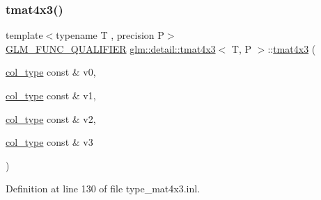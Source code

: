\subsubsection{\texorpdfstring{tmat4x3()}{tmat4x3()}\hspace{0.1cm}{\footnotesize\ttfamily [7/22]}}
{\footnotesize\ttfamily template$<$typename T , precision P$>$ \\
\hyperlink{setup_8hpp_a33fdea6f91c5f834105f7415e2a64407}{G\+L\+M\+\_\+\+F\+U\+N\+C\+\_\+\+Q\+U\+A\+L\+I\+F\+I\+ER} \hyperlink{structglm_1_1detail_1_1tmat4x3}{glm\+::detail\+::tmat4x3}$<$ T, P $>$\+::\hyperlink{structglm_1_1detail_1_1tmat4x3}{tmat4x3} (\begin{DoxyParamCaption}\item[{\hyperlink{structglm_1_1detail_1_1tmat4x3_a58afd510f7ab968e5a86e20f2f3979de}{col\+\_\+type} const \&}]{v0,  }\item[{\hyperlink{structglm_1_1detail_1_1tmat4x3_a58afd510f7ab968e5a86e20f2f3979de}{col\+\_\+type} const \&}]{v1,  }\item[{\hyperlink{structglm_1_1detail_1_1tmat4x3_a58afd510f7ab968e5a86e20f2f3979de}{col\+\_\+type} const \&}]{v2,  }\item[{\hyperlink{structglm_1_1detail_1_1tmat4x3_a58afd510f7ab968e5a86e20f2f3979de}{col\+\_\+type} const \&}]{v3 }\end{DoxyParamCaption})}



Definition at line 130 of file type\+\_\+mat4x3.\+inl.

\mbox{\label{structglm_1_1detail_1_1tmat4x3_acca51e285af4cb8da90b02a67daadf05}} 
